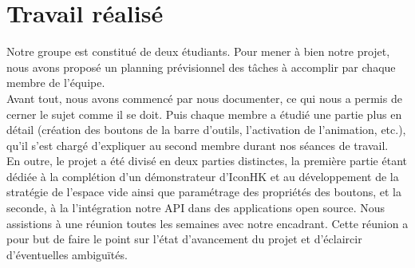 \documentclass[12pt,a4paper]{article}
\newcommand\tab[1][0.65cm]{\hspace*{#1}}
\begin{document}
\section{Travail réalisé}
Notre groupe est constitué de deux étudiants. Pour mener à bien notre projet, nous avons proposé un planning prévisionnel des tâches à accomplir par chaque membre de l’équipe.\\
\tab Avant tout, nous avons commencé par nous documenter, ce qui nous a permis de cerner le sujet comme il se doit. Puis chaque membre a étudié une partie plus en détail (création des boutons de la barre d’outils, l’activation de l’animation, etc.), qu’il s’est chargé d’expliquer au second membre durant nos séances de travail.\\
\tab En outre, le projet a été divisé en deux parties distinctes, la première partie étant dédiée à la complétion d'un démonstrateur d'IconHK et au développement de la stratégie de l'espace vide ainsi que paramétrage des propriétés des boutons, et la seconde, à la l'intégration notre API dans des applications open source. Nous assistions à une réunion toutes les semaines avec notre encadrant. Cette réunion a pour but de faire le point sur l’état d’avancement du projet et d’éclaircir d’éventuelles ambiguïtés.\\
\end{document}
